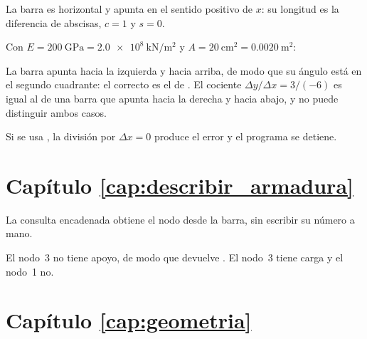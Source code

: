 La barra es horizontal y apunta en el sentido positivo de $x$: su longitud es
la diferencia de abscisas, $c = 1$ y $s = 0$.


Con $E = \SI{200}{\giga\pascal} = \SI{2.0e8}{\kilo\newton\per\metre\squared}$ y
$A = \SI{20}{\centi\metre\squared} = \SI{0.0020}{\metre\squared}$:

La barra apunta hacia la izquierda y hacia arriba, de modo que su ángulo está
en el segundo cuadrante: el correcto es el de . El cociente
$\Delta y / \Delta x = 3/(-6)$ es igual al de una barra que apunta hacia la
derecha y hacia abajo, y  no puede distinguir ambos casos.

Si se usa , la división por $\Delta x = 0$ produce el
error  y el programa se detiene.

\section*{Capítulo \ref{cap:describir_armadura}}

La consulta encadenada  obtiene el nodo
desde la barra, sin escribir su número a mano.


El nodo~3 no tiene apoyo, de modo que  devuelve . El nodo~3
tiene carga y el nodo~1 no.


\section*{Capítulo \ref{cap:geometria}}

